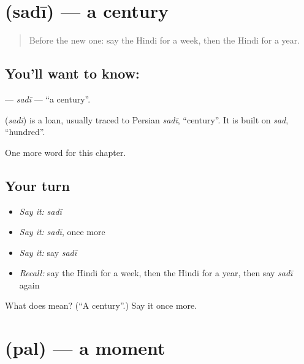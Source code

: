 \section[\texorpdfstring{\hi{सदी} (sadī)}{सदी (sadī)}]{ (sadī) — a century}

\label{lesson:HI-C191-sadi}



\begin{quote}
Before the new one: say the Hindi for a week, then the Hindi for a year.
\end{quote}

\subsection*{You'll want to know: }
\textbf{} — \emph{sadī} — \textquotedblleft{}a century\textquotedblright{}.

\begin{cousinweb}
\textbf{} (\emph{sadī}) is a loan, usually traced to Persian \emph{sadī}, \textquotedblleft{}century\textquotedblright{}. It is built on \emph{sad}, \textquotedblleft{}hundred\textquotedblright{}.
\end{cousinweb}

\begin{grammarlens}[title={What you've built}]
One more word for this chapter.
\end{grammarlens}

\subsection*{Your turn}
\begin{itemize}
\raggedright
  \item \emph{Say it:} \emph{sadī}
  \item \emph{Say it:} \emph{sadī}, once more
  \item \emph{Say it:} say \emph{sadī}
  \item \emph{Recall:} say the Hindi for a week, then the Hindi for a year, then say \emph{sadī} again
\end{itemize}

\begin{tcolorbox}[breakable,colback=teal!4,colframe=teal!35!black,title={Before you move on}]
What does  mean? (\textquotedblleft{}A century\textquotedblright{}.) Say it once more.
\end{tcolorbox}
\section[\texorpdfstring{\hi{पल} (pal)}{पल (pal)}]{ (pal) — a moment}

